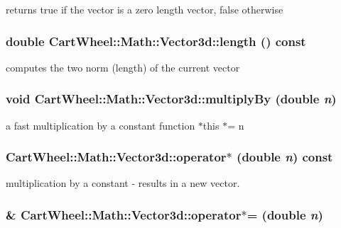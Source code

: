 returns true if the vector is a zero length vector, false otherwise \hypertarget{classCartWheel_1_1Math_1_1Vector3d_a2e5dcd4167c46a70c0a9eedd0e1abcd1}{
\subsubsection[{length}]{\setlength{\rightskip}{0pt plus 5cm}double CartWheel::Math::Vector3d::length () const}}
\label{classCartWheel_1_1Math_1_1Vector3d_a2e5dcd4167c46a70c0a9eedd0e1abcd1}
computes the two norm (length) of the current vector \hypertarget{classCartWheel_1_1Math_1_1Vector3d_af3f6c9c83c7f19a1ef765159ed42c5d0}{
\subsubsection[{multiplyBy}]{\setlength{\rightskip}{0pt plus 5cm}void CartWheel::Math::Vector3d::multiplyBy (double {\em n})}}
\label{classCartWheel_1_1Math_1_1Vector3d_af3f6c9c83c7f19a1ef765159ed42c5d0}
a fast multiplication by a constant function $\ast$this $\ast$= n \hypertarget{classCartWheel_1_1Math_1_1Vector3d_a584d0e2e0f2ca9ade782644458e524a7}{
\subsubsection[{operator$\ast$}]{ CartWheel::Math::Vector3d::operator$\ast$ (double {\em n}) const}}
\label{classCartWheel_1_1Math_1_1Vector3d_a584d0e2e0f2ca9ade782644458e524a7}
multiplication by a constant -\/ results in a new vector. \hypertarget{classCartWheel_1_1Math_1_1Vector3d_a1052925e7cb8182658b5323b26f368ba}{
\subsubsection[{operator$\ast$=}]{\& CartWheel::Math::Vector3d::operator$\ast$= (double {\em n})}}
